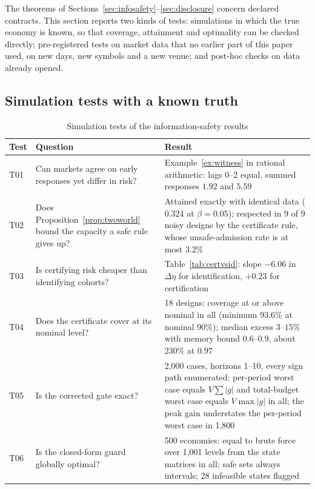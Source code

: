 \documentclass[12pt]{article}
\theoremstyle{definition}
\theoremstyle{remark}
\begin{document}
The theorems of Sections~\ref{sec:infosafety}--\ref{sec:disclosure} concern declared contracts. This section reports two kinds of tests: simulations in which the true economy is known, so that coverage, attainment and optimality can be checked directly; pre-registered tests on market data that no earlier part of this paper used, on new days, new symbols and a new venue; and post-hoc checks on data already opened.

\subsection{Simulation tests with a known truth}\label{sec:simtests}

\begin{table}[!tbp]\centering\footnotesize
\begin{threeparttable}
\caption{Simulation tests of the information-safety results}\label{tab:simtests}
\setlength{\tabcolsep}{3pt}
\begin{tabular}{p{}p{}p{}}
\toprule
Test & Question & Result\\
\midrule
T01 & Can markets agree on early responses yet differ in risk? & Example~\ref{ex:witness} in rational arithmetic: lags 0--2 equal, summed responses $1.92$ and $5.59$\\
T02 & Does Proposition~\ref{prop:twoworld} bound the capacity a safe rule gives up? & Attained exactly with identical data ($0.324$ at $\beta=0.05$); respected in 9 of 9 noisy designs by the certificate rule, whose unsafe-admission rate is at most $3.2\%$\\
T03 & Is certifying risk cheaper than identifying cohorts? & Table~\ref{tab:certvsid}: slope $-6.06$ in $\Delta\eta$ for identification, $+0.23$ for certification\\
T04 & Does the certificate cover at its nominal level? & 18 designs: coverage at or above nominal in all (minimum $93.6\%$ at nominal $90\%$); median excess $3$--$15\%$ with memory bound $0.6$--$0.9$, about $230\%$ at $0.97$\\
T05 & Is the corrected gate exact? & 2{,}000 cases, horizons 1--10, every sign path enumerated: per-period worst case equals $V\sum|g|$ and total-budget worst case equals $V\max|g|$ in all; the peak gain understates the per-period worst case in 1{,}800\\
T06 & Is the closed-form guard globally optimal? & 500 economies: equal to brute force over 1{,}001 levels from the state matrices in all; safe sets always intervals; 28 infeasible states flagged\\

\end{tabular}
\end{threeparttable}
\end{table}
\end{document}
